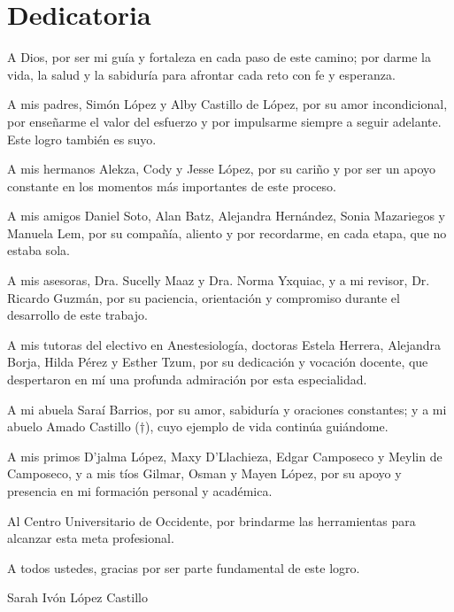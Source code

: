 \chapter*{Dedicatoria}

A Dios, por ser mi guía y fortaleza en cada paso de este camino; por darme la
vida, la salud y la sabiduría para afrontar cada reto con fe y esperanza.

A mis padres, Simón López y Alby Castillo de López, por su amor incondicional,
por enseñarme el valor del esfuerzo y por impulsarme siempre a seguir adelante.
Este logro también es suyo.

A mis hermanos Alekza, Cody y Jesse López, por su cariño y por ser un apoyo
constante en los momentos más importantes de este proceso.

A mis amigos Daniel Soto, Alan Batz, Alejandra Hernández, Sonia Mazariegos y
Manuela Lem, por su compañía, aliento y por recordarme, en cada etapa, que no
estaba sola.

A mis asesoras, Dra. Sucelly Maaz y Dra. Norma Yxquiac, y a mi revisor, Dr.
Ricardo Guzmán, por su paciencia, orientación y compromiso durante el desarrollo
de este trabajo.

A mis tutoras del electivo en Anestesiología, doctoras Estela Herrera, Alejandra
Borja, Hilda Pérez y Esther Tzum, por su dedicación y vocación docente, que
despertaron en mí una profunda admiración por esta especialidad.

A mi abuela Saraí Barrios, por su amor, sabiduría y oraciones constantes; y a mi
abuelo Amado Castillo ($\dagger$), cuyo ejemplo de vida continúa guiándome.

A mis primos D’jalma López, Maxy D’Llachieza, Edgar Camposeco y Meylin de
Camposeco, y a mis tíos Gilmar, Osman y Mayen López, por su apoyo y presencia en
mi formación personal y académica.

Al Centro Universitario de Occidente, por brindarme las herramientas para
alcanzar esta meta profesional.

A todos ustedes, gracias por ser parte fundamental de este logro.

\vspace{0.5cm}

\begin{flushright}
Sarah Ivón López Castillo
\end{flushright}
